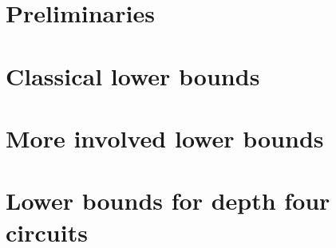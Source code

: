 






\tableofcontents



\part{Preliminaries}










\part{Classical lower bounds}





\part{More involved lower bounds}





\part{Lower bounds for depth four circuits}












